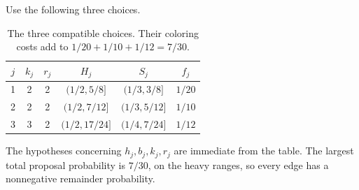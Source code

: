 \documentclass[11pt]{article}
\theoremstyle{definition}\newtheorem{algorithm}{Algorithm}[section]
\numberwithin{equation}{section}
\theoremstyle{remark}\newtheorem*{remark}{Remark}
\begin{document}
Use the following three choices.

\begin{table}[htbp]
\centering
\begin{tabular}{c|c c|c|c|c}
$j$ & $k_j$ & $r_j$ & $H_j$ & $S_j$ & $f_j$\\ \hline
1&2&2&$(1/2,5/8]$&$(1/3,3/8]$&$1/20$\\
2&2&2&$(1/2,7/12]$&$(1/3,5/12]$&$1/10$\\
3&3&2&$(1/2,17/24]$&$(1/4,7/24]$&$1/12$
\end{tabular}
\caption{The three compatible choices.  Their coloring costs add to
$1/20+1/10+1/12=7/30$.}
\label{tab:three-compatible-modes}
\end{table}

The hypotheses concerning $h_j,b_j,k_j,r_j$ are immediate from the
table.  The largest total proposal probability is $7/30$, on the heavy
ranges, so every edge has a nonnegative remainder probability.
\end{document}
